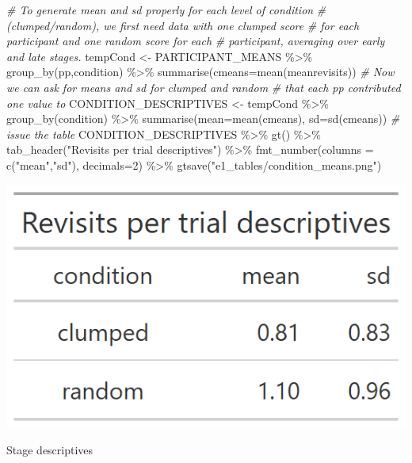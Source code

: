 \documentclass[
]{book}
\newenvironment{Shaded}{\begin{snugshade}}{\end{snugshade}}
\newcommand{\AttributeTok}[1]{\textcolor[rgb]{0.77,0.63,0.00}{#1}}
\newcommand{\CommentTok}[1]{\textcolor[rgb]{0.56,0.35,0.01}{\textit{#1}}}
\newcommand{\DecValTok}[1]{\textcolor[rgb]{0.00,0.00,0.81}{#1}}
\newcommand{\FunctionTok}[1]{\textcolor[rgb]{0.00,0.00,0.00}{#1}}
\newcommand{\NormalTok}[1]{#1}
\newcommand{\OtherTok}[1]{\textcolor[rgb]{0.56,0.35,0.01}{#1}}
\newcommand{\SpecialCharTok}[1]{\textcolor[rgb]{0.00,0.00,0.00}{#1}}
\newcommand{\StringTok}[1]{\textcolor[rgb]{0.31,0.60,0.02}{#1}}
\begin{document}
\begin{Shaded}
\begin{Highlighting}[]
\CommentTok{\# To generate mean and sd properly for each level of condition }
\CommentTok{\# (clumped/random), we first need data with one clumped score }
\CommentTok{\# for each participant and one random score for each }
\CommentTok{\# participant, averaging over early and late stages.}
\NormalTok{tempCond }\OtherTok{\textless{}{-}}\NormalTok{ PARTICIPANT\_MEANS }\SpecialCharTok{\%\textgreater{}\%} 
  \FunctionTok{group\_by}\NormalTok{(pp,condition) }\SpecialCharTok{\%\textgreater{}\%} \FunctionTok{summarise}\NormalTok{(}\AttributeTok{cmeans=}\FunctionTok{mean}\NormalTok{(meanrevisits))}
\CommentTok{\# Now we can ask for means and sd for clumped and random }
\CommentTok{\# that each pp contributed one value to}
\NormalTok{CONDITION\_DESCRIPTIVES }\OtherTok{\textless{}{-}}\NormalTok{ tempCond }\SpecialCharTok{\%\textgreater{}\%} 
  \FunctionTok{group\_by}\NormalTok{(condition) }\SpecialCharTok{\%\textgreater{}\%} 
  \FunctionTok{summarise}\NormalTok{(}\AttributeTok{mean=}\FunctionTok{mean}\NormalTok{(cmeans), }\AttributeTok{sd=}\FunctionTok{sd}\NormalTok{(cmeans))}
\CommentTok{\# issue the table}
\NormalTok{CONDITION\_DESCRIPTIVES }\SpecialCharTok{\%\textgreater{}\%} 
  \FunctionTok{gt}\NormalTok{() }\SpecialCharTok{\%\textgreater{}\%} 
  \FunctionTok{tab\_header}\NormalTok{(}\StringTok{"Revisits per trial descriptives"}\NormalTok{) }\SpecialCharTok{\%\textgreater{}\%} 
  \FunctionTok{fmt\_number}\NormalTok{(}\AttributeTok{columns =} \FunctionTok{c}\NormalTok{(}\StringTok{"mean"}\NormalTok{,}\StringTok{"sd"}\NormalTok{), }\AttributeTok{decimals=}\DecValTok{2}\NormalTok{) }\SpecialCharTok{\%\textgreater{}\%} 
  \FunctionTok{gtsave}\NormalTok{(}\StringTok{"e1\_tables/condition\_means.png"}\NormalTok{)}
\end{Highlighting}
\end{Shaded}

\includegraphics[width=0.33\linewidth]{e1_figures/CONDITION_DESCRIPTIVES-1}

Stage descriptives
\end{document}
